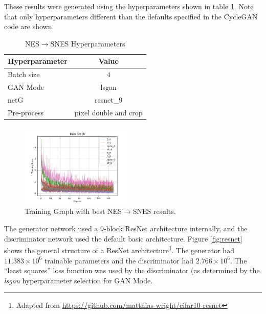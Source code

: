 \documentclass[10pt,twocolumn,letterpaper]{article}
\begin{document}
These results were generated using the hyperparameters shown in table \ref{tab:sneshyperparameters}. Note that only hyperparameters different than the defaults specified in the CycleGAN code are shown. 

\begin{table}[H]
   \begin{center}
      \begin{tabular}{|l|c|}
         \hline
         \textbf{Hyperparameter} & \textbf{Value} \\
         \hline\hline
         Batch size     & $4$ \\ 
         \hline
                  GAN Mode     & lsgan\\
         \hline
         netG       & resnet\_9  \\ 
         \hline
         Pre-process     & pixel double and crop \\
         \hline
      \end{tabular}
   \end{center}
   \caption{NES$\rightarrow$SNES Hyperparameters}
   \label{tab:sneshyperparameters}
\end{table}

\begin{figure}[H]
   \centering
   \includegraphics[width=0.475\textwidth]{figures/graphs/train_graph_snes.png}
   \caption{Training Graph with best NES$\rightarrow$SNES results.}
   \label{fig:snesgraph}
\end{figure}

The generator network used a 9-block ResNet architecture internally, and the discriminator network used the default basic architecture. Figure \ref{fig:resnet} shows the general structure of a ResNet architecture\footnote{Adapted from \url{https://github.com/matthias-wright/cifar10-resnet}}. The generator had $11.383 \times 10^6$ trainable parameters and the discriminator had $2.766 \times 10^6$.
The ``least squares'' loss function was used by the discriminator (as determined by the \textit{lsgan} hyperparameter selection for GAN Mode.
\end{document}
